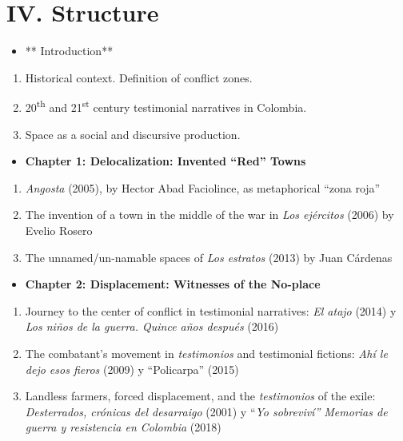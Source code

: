 \documentclass[
  11pt,
,
onecolumn,
openany
]{book}
\providecommand{\tightlist}{%
  \setlength{\itemsep}{0pt}\setlength{\parskip}{0pt}}
\begin{document}
\hypertarget{iv.-structure}{%
\chapter{IV. Structure}\label{iv.-structure}}

\begin{itemize}
\tightlist
\item
  ** Introduction**
\end{itemize}

\begin{enumerate}
\def\labelenumi{\arabic{enumi}.}
\item
  Historical context. Definition of conflict zones.
\item
  20\textsuperscript{th} and 21\textsuperscript{st} century testimonial
  narratives in Colombia.
\item
  Space as a social and discursive production.
\end{enumerate}

\begin{itemize}
\tightlist
\item
  \textbf{Chapter 1: Delocalization: Invented ``Red'' Towns}
\end{itemize}

\begin{enumerate}
\def\labelenumi{\arabic{enumi}.}
\item
  \emph{Angosta} (2005), by Hector Abad Faciolince, as metaphorical ``zona
  roja''
\item
  The invention of a town in the middle of the war in \emph{Los ejércitos}
  (2006) by Evelio Rosero
\item
  The unnamed/un-namable spaces of \emph{Los estratos} (2013) by Juan
  Cárdenas~
\end{enumerate}

\begin{itemize}
\tightlist
\item
  \textbf{Chapter 2: Displacement: Witnesses of the No-place}
\end{itemize}

\begin{enumerate}
\def\labelenumi{\arabic{enumi}.}
\item
  Journey to the center of conflict in testimonial narratives: \emph{El atajo}
  (2014) y \emph{Los niños de la guerra. Quince años después} (2016)~
\item
  The combatant's movement in \emph{testimonios} and testimonial fictions:
  \emph{Ahí le dejo esos fieros} (2009) y ``Policarpa'' (2015)
\item
  Landless farmers, forced displacement, and the \emph{testimonios} of the
  exile: \emph{Desterrados, crónicas del desarraigo} (2001) y ``\emph{Yo
  sobreviví'' Memorias de guerra y resistencia en Colombia} (2018)~
\end{enumerate}
\end{document}
